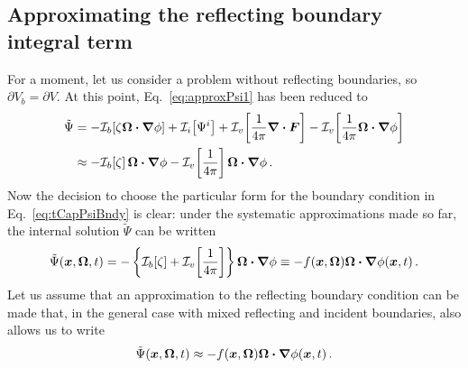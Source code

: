 \subsection{Approximating the reflecting boundary integral term}\label{sec:derReflBc}
For a moment, let us consider a problem without reflecting boundaries, so
$\partial V_b = \partial V$. At this point, Eq.~\eqref{eq:approxPsi1} has been
reduced to
\begin{align*}
  \tilde\Psi
  &= -\mathcal{I}_{b}\!\left[\zeta \bm{\Omega}\bm{\cdot} \bm{\nabla} \phi\right]
    + \mathcal{I}_{i}\!\left[\Psi^i\right]
    + \mathcal{I}_{v}\!\left[\frac{1}{4\pi} \bm{\nabla} \bm{\cdot}\bm{F} \right]
    - \mathcal{I}_{v}\!\left[\frac{1}{4\pi} \bm{\Omega}\bm{\cdot} \bm{\nabla} \phi\right]
\\
  &\approx
  -\mathcal{I}_{b}\!\left[\zeta\right] \bm{\Omega}\bm{\cdot} \bm{\nabla} \phi
  - \mathcal{I}_{v}\!\left[\frac{1}{4\pi}\right] \bm{\Omega}\bm{\cdot} \bm{\nabla} \phi \,.
\end{align*}
Now the decision to choose the particular form for the boundary condition in
Eq.~\eqref{eq:tCapPsiBndy}
is clear: under the systematic approximations made so far, the internal solution
$\tilde\Psi$ can be written
\begin{equation*}
  \tilde\Psi(\bm{x}, \bm{\Omega}, t)
  = - \left\{ \mathcal{I}_{b}\!\left[\zeta\right] + \mathcal{I}_{v}\!\left[\frac{1}{4\pi}\right]
  \right\} \bm{\Omega}\bm{\cdot} \bm{\nabla} \phi
  \equiv - f(\bm{x}, \bm{\Omega}) \bm{\Omega}\bm{\cdot} \bm{\nabla} \phi(\bm{x}, t)\,.
\end{equation*}
Let us assume that an approximation to the reflecting boundary condition can
be made that, in the general case with mixed reflecting and incident
boundaries, also allows us to write 
\begin{equation*}
  \tilde\Psi(\bm{x}, \bm{\Omega}, t)
  \approx - f(\bm{x}, \bm{\Omega}) \bm{\Omega}\bm{\cdot} \bm{\nabla} \phi(\bm{x}, t)\,.
\end{equation*}


